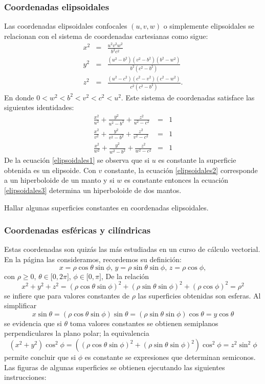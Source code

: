 \subsubsection{Coordenadas elipsoidales} 
Las coordenadas elipsoidales confocales $\left( u,v,w\right) $ o simplemente elipsoidales se relacionan con el sistema de coordenadas cartesianas como sigue:
\begin{eqnarray*}
x^{2} &=&\frac{u^2 v^2 w^2}{b^2 c^2} \\
y^{2} &=&\frac{(u^2-b^2)(v^2-b^2)(b^2-w^2)}{b^2(c^2-b^2)} \\
z^{2}&=& \frac{(u^2-c^2)(c^2-v^2)(c^2-w^2)}{c^2(c^2-b^2)}.
\end{eqnarray*}
En donde  $0<w^2<b^2<v^2<c^2<u^2$. Este sistema de coordenadas satisface las siguientes identidades:
\begin{eqnarray}
\frac{x^2}{u^2}+\frac{y^2}{u^2-b^2}+\frac{z^2}{u^2-c^2}&=& 1 \label{elipsoidales1}\\
\frac{x^2}{v^2}+\frac{y^2}{v^2-b^2}+\frac{z^2}{v^2-c^2} &=&1 \label{elipsoidales2}\\
\frac{x^2}{w^2}+\frac{y^2}{w^2-b^2}+\frac{z^2}{w^2-c^2} &=&1 \label{elipsoidales3}
\end{eqnarray}
De la ecuación \ref{elipsoidales1} se observa que si $u$ es constante la superficie obtenida es un elipsoide.
Con $v$ constante, la ecuación \ref{elipsoidales2} corresponde a un hiperboloide de un manto y si
$w$ es constante entonces la ecuación \ref{elipsoidales3} determina un hiperboloide de dos mantos.
\begin{ejer}
Hallar algunas superficies constantes en coordenadas elipsoidales.
\end{ejer}

\subsubsection{Coordenadas esféricas y cilíndricas}  
Estas coordenadas son quizás las más estudiadas en un curso de cálculo vectorial. En la página \pageref{esfericas} las consideramos, recordemos su definición:
\[x=\rho \cos \theta \sin \phi, \, y=\rho \sin \theta \sin \phi,\,z=\rho \cos \phi,\]
con $\rho \geq 0$, $\theta \in \lbrack 0,2\pi ]$, $\phi \in \lbrack 0,\pi ]$,
De la relación
\[x^{2}+y^{2}+z^{2}=(\rho \cos \theta \sin \phi)^{2}+(\rho \sin \theta \sin \phi)^{2}+(\rho \cos \phi) ^{2}=\rho ^{2}\]
se infiere que para valores constantes de $\rho $ las superficies obtenidas son esferas.
Al simplificar
\[x\sin \theta =( \rho \cos \theta \sin \phi)\sin \theta =( \rho \sin \theta \sin \phi ) \cos \theta
=y\cos \theta\]
se evidencia que si $\theta $ toma valores constantes se obtienen semiplanos perpendiculares la plano polar;
la equivalencia
\[(x^{2}+y^{2}) \cos ^{2}\phi = ( ( \rho \cos \theta\sin \phi ) ^{2}+( \rho \sin \theta \sin \phi ) ^{2})
\cos^{2}\phi =z^{2}\sin^{2}\phi\]
permite concluir que si $\phi $ es constante se expresiones que determinan semiconos.
Las figuras de algunas superficies se obtienen ejecutando las siguientes instrucciones:

